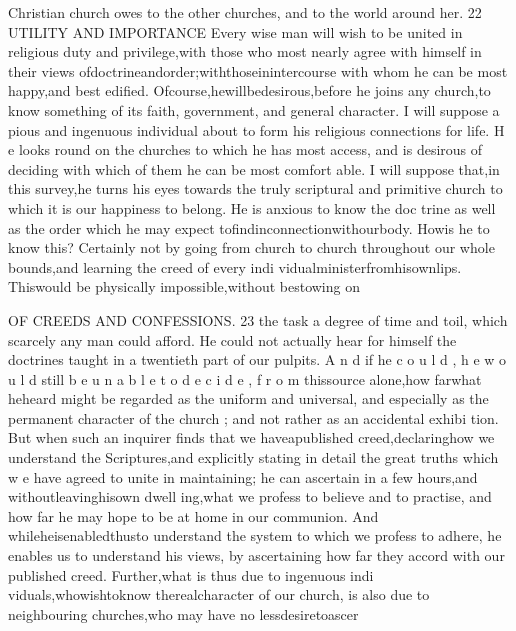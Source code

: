 \documentclass[
]{book}
\begin{document}
Christian church owes to the other churches, and to the world around her.
22
UTILITY AND IMPORTANCE
Every wise man will wish to be united in
religious duty and privilege,with those who
most nearly agree with himself in their views
ofdoctrineandorder;withthoseinintercourse
with whom he can be most happy,and best
edified. Ofcourse,hewillbedesirous,before
he joins any church,to know something of its
faith, government, and general character. I
will suppose a pious and ingenuous individual
about to form his religious connections for life. H e looks round on the churches to which he
has most access, and is desirous of deciding with which of them he can be most comfort
able. I will suppose that,in this survey,he turns his eyes towards the truly scriptural and
primitive church to which it is our happiness to belong. He is anxious to know the doc
trine as well as the order which he may expect tofindinconnectionwithourbody. Howis he to know this? Certainly not by going
from church to church throughout our whole bounds,and learning the creed of every indi vidualministerfromhisownlips. Thiswould
be physically impossible,without bestowing on

OF CREEDS AND CONFESSIONS. 23
the task a degree of time and toil, which
scarcely any man could afford. He could not
actually hear for himself the doctrines taught
in a twentieth part of our pulpits. A n d if he c o u l d , h e w o u l d still b e u n a b l e t o d e c i d e , f r o m
thissource alone,how farwhat heheard might
be regarded as the uniform and universal, and
especially as the permanent character of the
church ; and not rather as an accidental exhibi
tion. But when such an inquirer finds that
we haveapublished creed,declaringhow we
understand the Scriptures,and explicitly stating
in detail the great truths which w e have agreed
to unite in maintaining; he can ascertain in a
few hours,and withoutleavinghisown dwell
ing,what we profess to believe and to practise,
and how far he may hope to be at home in our communion. And whileheisenabledthusto
understand the system to which we profess to adhere, he enables us to understand his views, by ascertaining how far they accord with our
published creed.
Further,what is thus due to ingenuous indi viduals,whowishtoknow therealcharacter of our church, is also due to neighbouring churches,who may have no lessdesiretoascer
\end{document}
